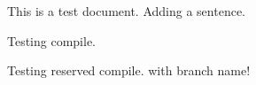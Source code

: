 \documentclass{article}
\begin{document}
This is a test document.
Adding a sentence.

Testing compile.

Testing reserved compile. with branch name!
\end{document}
